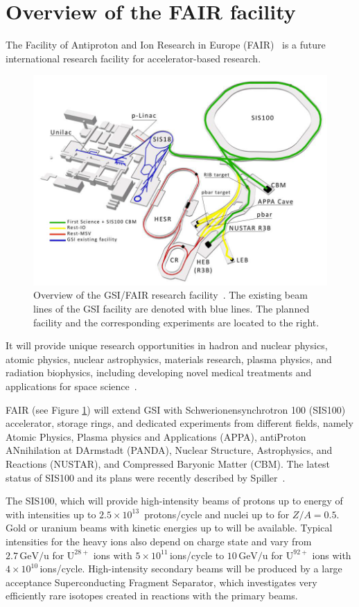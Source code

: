 \section{Overview of the FAIR facility}
The Facility of Antiproton and Ion Research in Europe (\gls{FAIR})~\cite{fair} is a future international research facility for accelerator-based research. 

\begin{figure}[!h]
    \centering
    \includegraphics[width=0.85\columnwidth]{Chapter1/images/fair2.png}
    \caption{Overview of the GSI/FAIR research facility~\cite{fair}. The existing beam lines of the \gls{GSI} facility are denoted with blue lines. The planned facility and the corresponding experiments are located to the right.}
    \label{fig:fair}
\end{figure}

It will provide unique research opportunities in hadron and nuclear physics, atomic physics, nuclear astrophysics, materials research, plasma physics, and radiation biophysics, including developing novel medical treatments and applications for space science~\cite{fair1}. 
 
FAIR (see Figure \ref{fig:fair}) will extend GSI with Schwerionensynchrotron 100 (SIS100) accelerator, storage rings, and dedicated experiments from different fields, namely Atomic Physics, Plasma physics and Applications (APPA), antiProton ANnihilation at DArmstadt (PANDA), Nuclear Structure, Astrophysics, and Reactions (NUSTAR), and Compressed Baryonic Matter (\gls{CBM}). The latest status of SIS100 and its plans were recently described by Spiller~\cite{Spiller_2020}.

The SIS100, which will provide high-intensity beams of protons up
to energy of   with intensities up to $2.5\times 10^{13}$~protons/cycle and nuclei up to  for $Z/A = 0.5$. Gold or uranium beams with kinetic energies up to  will be available. Typical intensities for the heavy ions also depend on charge state and vary from $2.7\,\mathrm{GeV/u}$ for $\mathrm{U^{28+}}$ ions with $5\times 10^{11}$\,ions/cycle to $10\,\mathrm{GeV/u}$ for $\mathrm{U^{92+}}$ ions with $4\times 10^{10}$\,ions/cycle. High-intensity secondary beams will be produced by a large acceptance Superconducting Fragment Separator, which investigates very efficiently rare isotopes created in reactions with the primary beams. 

